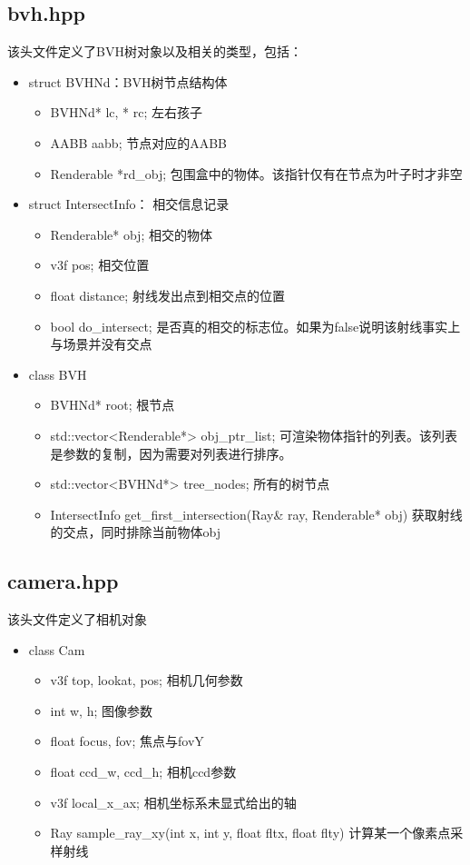 \documentclass[12pt]{article}
\begin{document}
\subsection{bvh.hpp}
该头文件定义了BVH树对象以及相关的类型，包括：
\begin{itemize}
    \item struct BVHNd：BVH树节点结构体
    \begin{itemize}
        \item BVHNd* lc, * rc; 左右孩子
        \item AABB aabb; 节点对应的AABB
        \item Renderable *rd\_obj; 包围盒中的物体。该指针仅有在节点为叶子时才非空
    \end{itemize}
    \item struct IntersectInfo： 相交信息记录
    \begin{itemize}
        \item Renderable* obj; 相交的物体
        \item v3f pos; 相交位置
        \item float distance; 射线发出点到相交点的位置
        \item bool do\_intersect; 是否真的相交的标志位。如果为false说明该射线事实上与场景并没有交点
    \end{itemize}
    \item class BVH
    \begin{itemize}
        \item BVHNd* root; 根节点
        \item std::vector<Renderable*> obj\_ptr\_list; 可渲染物体指针的列表。该列表是参数的复制，因为需要对列表进行排序。
        \item std::vector<BVHNd*> tree\_nodes; 所有的树节点
        \item IntersectInfo get\_first\_intersection(Ray\& ray, Renderable* obj) 获取射线的交点，同时排除当前物体obj
    \end{itemize}
\end{itemize}

\subsection{camera.hpp}
该头文件定义了相机对象
\begin{itemize}
    \item class Cam
    \begin{itemize}
        \item v3f top, lookat, pos; 相机几何参数
        \item int w, h; 图像参数
        \item float focus, fov; 焦点与fovY
        \item float ccd\_w, ccd\_h; 相机ccd参数
        \item v3f local\_x\_ax; 相机坐标系未显式给出的轴
        \item Ray sample\_ray\_xy(int x, int y, float fltx, float flty) 计算某一个像素点采样射线
    \end{itemize}
\end{itemize}
\end{document}
